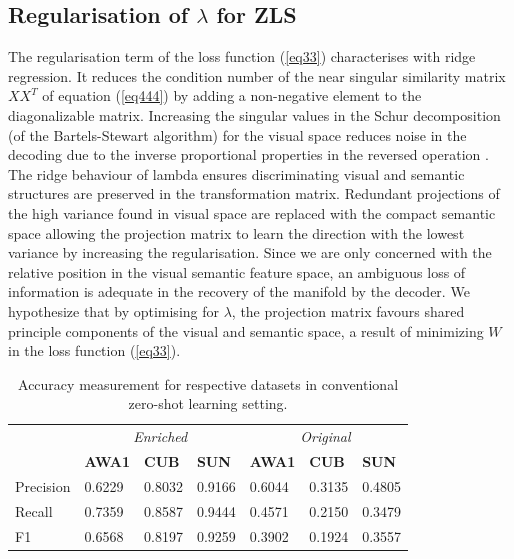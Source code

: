 \documentclass{article}
\begin{document}
\subsection{Regularisation of $\lambda$ for ZLS}
The regularisation term of the loss function (\ref{eq33}) characterises with ridge regression. It reduces the condition number of the near singular similarity matrix $XX^T$ of equation (\ref{eq444}) by adding a non-negative element to the diagonalizable matrix. Increasing the singular values in the Schur decomposition (of the Bartels-Stewart algorithm) for the visual space reduces noise in the decoding due to the inverse proportional properties in the reversed operation \cite{b53}. The ridge behaviour of lambda ensures discriminating visual and semantic structures are preserved in the transformation matrix. Redundant projections of the high variance found in visual space are replaced with the compact semantic space allowing the projection matrix to learn the direction with the lowest variance by increasing the regularisation. Since we are only concerned with the relative position in the visual semantic feature space, an ambiguous loss of information is adequate in the recovery of the manifold by the decoder. We hypothesize that by optimising for $\lambda$, the projection matrix favours shared principle components of the visual and semantic space, a result of minimizing $W$ in the loss function (\ref{eq33}).

\begin{table}[h]
\centering
\footnotesize
\caption{Accuracy measurement for respective datasets in conventional zero-shot learning setting.}
\begin{tabular}{|l|lll|lll|}
\hline
          & \multicolumn{3}{c|}{\textit{Enriched}}      & \multicolumn{3}{c|}{\textit{Original}}       \\
          & \textbf{AWA1} & \textbf{CUB} & \textbf{SUN} & \textbf{AWA1} & \textbf{CUB} & \textbf{SUN} \\
          \hline
Precision & 0.6229        & 0.8032       & 0.9166       & 0.6044        & 0.3135       & 0.4805       \\
Recall    & 0.7359        & 0.8587       & 0.9444       & 0.4571        & 0.2150       & 0.3479       \\
F1        & 0.6568        & 0.8197       & 0.9259       & 0.3902        & 0.1924       & 0.3557\\
\hline
\end{tabular}
\label{tab:accuracy}
\end{table}
\end{document}
